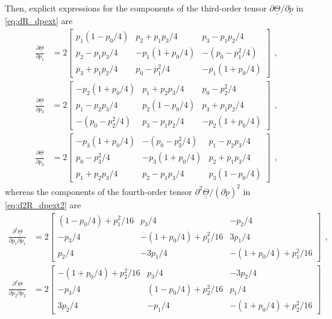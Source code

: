\documentclass[12pt,a4paper,oneside,english]{abntex2} %
\newcommand{\vect}[1]{\underline{#1}}
\newcommand{\del}[2]{\frac{\partial#1}{\partial#2}}
\def\tens#1{\underline{\underline{#1}}}
\def\lp{\left(}
\def\rp{\right)}
\def\p{\vect{p}}
\def\pscaled{\mathring{\p}}
\def\Th{\tens{\Theta}}
\begin{document}
\begin{apendicesenv}
Then, explicit expressions for the components of the third-order tensor $\partial\Th/\partial\pscaled$ in \cref{eq:dR_dpext} are
\begin{align}
    \del{\Th}{p_1} &= 
    2\begin{bmatrix}
    p_1\lp1-p_0/4\rp & p_2+p_1p_3/4 & p_3-p_1p_2/4
    \\ 
    p_2-p_1p_3/4 & -p_1\lp1+p_0/4\rp & -\lp p_0-p_1^2/4\rp
    \\ 
    p_3+p_1p_2/4 & p_0-p_1^2/4 & -p_1\lp1+p_0/4\rp
    \end{bmatrix} \ \ ,
    \label{eq:dT_dp1}
    \\
    \del{\Th}{p_2} &= 
    2\begin{bmatrix}
    -p_2\lp1+p_0/4\rp & p_1+p_2p_3/4 & p_0-p_2^2/4
    \\ 
    p_1-p_2p_3/4 & p_2\lp1-p_0/4\rp & p_3+p_1p_2/4
    \\ 
    -\lp p_0-p_2^2/4\rp & p_3-p_1p_2/4 & -p_2\lp1+p_0/4\rp
    \end{bmatrix} \ \ ,
    \label{eq:dT_dp2}
    \\
    \del{\Th}{p_3} &= 
    2\begin{bmatrix}
    -p_3\lp1+p_0/4\rp & -\lp p_0-p_3^2/4\rp & p_1-p_2p_3/4
    \\ 
    p_0-p_3^2/4 & -p_3\lp1+p_0/4\rp & p_2+p_1p_3/4
    \\ 
    p_1+p_2p_3/4 & p_2-p_1p_3/4 & p_3\lp1-p_0/4\rp
    \end{bmatrix} \ \ ,
    \label{eq:dT_dp3}
\end{align}
whereas the components of the fourth-order tensor $\partial^2\Th/\lp\partial\pscaled\rp^2$ in \cref{eq:d2R_dpext2} are
\begin{align}
    \frac{\partial^2\Th}{\partial p_1\partial p_1} &= 
    2\begin{bmatrix}
    \lp1-p_0/4\rp+p_1^2/16 & p_3/4 & -p_2/4
    \\ 
    -p_3/4 & -\lp1+p_0/4\rp+p_1^2/16 & 3p_1/4
    \\ 
    p_2/4 & -3p_1/4 & -\lp1+p_0/4\rp+p_1^2/16
    \end{bmatrix} \ \ ,
    \label{eq:dT_dp1dp1}
    \\
    \frac{\partial^2\Th}{\partial p_2\partial p_2} &= 
    2\begin{bmatrix}
    -\lp1+p_0/4\rp+p_2^2/16 & p_3/4 & -3p_2/4
    \\ 
    -p_3/4 & \lp1-p_0/4\rp+p_2^2/16 & p_1/4
    \\ 
    3p_2/4 & -p_1/4 & -\lp1+p_0/4\rp+p_2^2/16

\end{bmatrix}
\end{align}
\end{apendicesenv}
\end{document}
